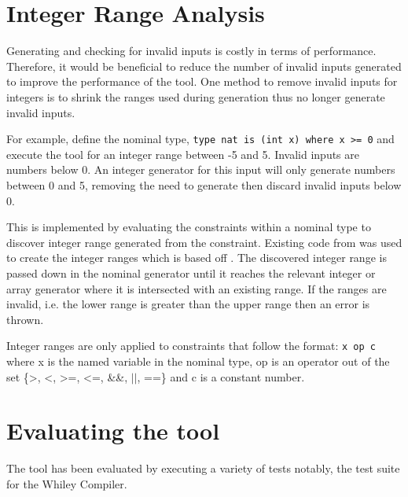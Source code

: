 \section{Integer Range Analysis}

Generating and checking for invalid inputs is costly in terms of performance. 
Therefore, it would be beneficial to reduce the number of invalid inputs generated to improve the performance of the tool.
One method to remove invalid inputs for integers is to shrink the ranges used during generation thus no longer generate invalid inputs.

For example, define the nominal type, \texttt{type nat is (int x) where x \textgreater= 0} and execute the tool for an integer range between -5 and 5. Invalid inputs are numbers below 0. An integer generator for this input will only generate numbers between 0 and 5, removing the need to generate then discard invalid inputs below 0.

This is implemented by evaluating the constraints within a nominal type to discover integer range generated from the constraint.
Existing code from \cite{whileyIntegerRangeCode} was used to create the integer ranges which is based off \cite{whileyIntegerRange}.
The discovered integer range is passed down in the nominal generator until it reaches the relevant integer or array generator where it is intersected with an existing range.
If the ranges are invalid, i.e. the lower range is greater than the upper range then an error is thrown.

Integer ranges are only applied to constraints that follow the format: \texttt{x op c} where x is the named variable in the nominal type, op is an operator out of the set \{\textgreater, \textless, \textgreater=, \textless=, \&\&, $||$, ==\} and c is a constant number.

\section{Evaluating the tool}
The tool has been evaluated by executing a variety of tests notably, the test suite for the Whiley Compiler.

